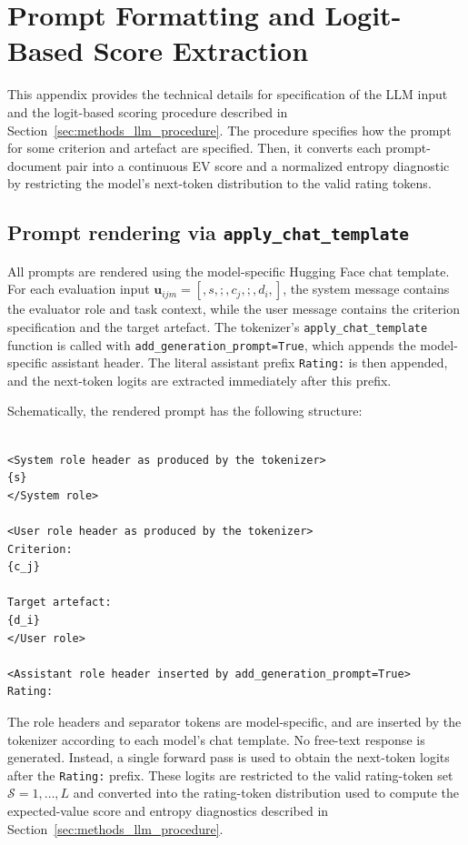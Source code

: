 \section{Prompt Formatting and Logit-Based Score Extraction}
\label{app:llm_scoring_implementation}

This appendix provides the technical details for specification of the LLM input and the logit-based scoring procedure described in Section~\ref{sec:methods_llm_procedure}. The procedure specifies how the prompt for some criterion and artefact are specified. Then, it converts each prompt-document pair into a continuous EV score and a normalized entropy diagnostic by restricting the model's next-token distribution to the valid rating tokens.


\subsection{Prompt rendering via \texttt{apply\_chat\_template}}\label{app:apply_chat_template}


All prompts are rendered using the model-specific Hugging Face chat template. For each evaluation input $\mathbf{u}_{ijm}=[,s,;,c_j,;,d_i,]$, the system message contains the evaluator role and task context, while the user message contains the criterion specification and the target artefact. The tokenizer's \texttt{apply\_chat\_template} function is called with \texttt{add\_generation\_prompt=True}, which appends the model-specific assistant header. The literal assistant prefix \texttt{Rating:} is then appended, and the next-token logits are extracted immediately after this prefix.

Schematically, the rendered prompt has the following structure:

\begin{lstlisting}[basicstyle=\ttfamily\small, breaklines=true] 

<System role header as produced by the tokenizer>
{s}
</System role>

<User role header as produced by the tokenizer>
Criterion:
{c_j}

Target artefact:
{d_i}
</User role>

<Assistant role header inserted by add_generation_prompt=True>
Rating:
\end{lstlisting}

The role headers and separator tokens are model-specific, and are inserted by the tokenizer according to each model's chat template. No free-text response is generated. Instead, a single forward pass is used to obtain the next-token logits after the \texttt{Rating:} prefix. These logits are restricted to the valid rating-token set $\mathcal{S}={1,\ldots,L}$ and converted into the rating-token distribution used to compute the expected-value score and entropy diagnostics described in Section~\ref{sec:methods_llm_procedure}.



